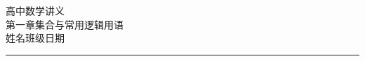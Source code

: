 \documentclass[11pt,a4paper,fontset=windows]{ctexart}
\begin{document}
\begin{center}
  {\heiti{} 高中数学讲义}\\[0.8em]
  {\kaishu{} 第一章\quad 集合与常用逻辑用语}\\[1.2em]
  {\small 姓名\blank[3cm]\quad 班级\blank[2cm]\quad 日期\blank[2cm]}
\end{center}

\vspace{0.4em}
{\color{mainblue}\noindent\rule{\linewidth}{0.8pt}}
\vspace{0.8em}






\end{document}
